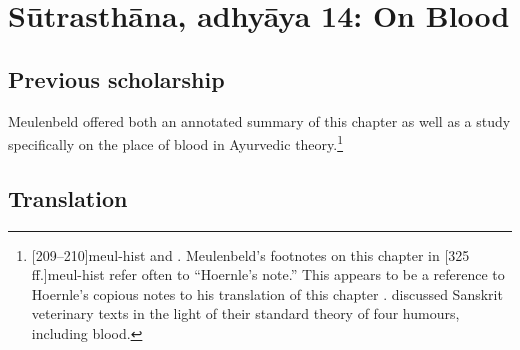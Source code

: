 
\section{Sūtrasthāna, adhyāya 14:  On Blood}


\subsection{Previous scholarship}

Meulenbeld offered both an annotated summary of this chapter as well as a
study specifically on the place of blood in Ayurvedic
theory.\footnote{[209--210]{meul-hist}  and \cite{meul-1991}.
    Meulenbeld's footnotes on this chapter in
    [325\,ff.]{meul-hist} refer often to ``Hoernle's note.'' 
    This appears to be a reference to Hoernle's copious notes to his
    translation of this chapter \citep[87--98]{hoer-1897}. \citet{meul-1990} 
    discussed Sanskrit veterinary texts in the light of their standard theory of four 
    humours, including blood.}

\subsection{Translation}

